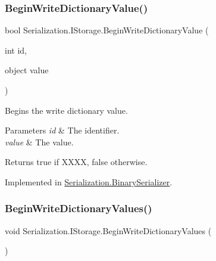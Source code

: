 \mbox{\label{interface_serialization_1_1_i_storage_a553edaa5a225986c161626c9ede9e594}} 
\subsubsection{\texorpdfstring{Begin\+Write\+Dictionary\+Value()}{BeginWriteDictionaryValue()}}
{\footnotesize\ttfamily bool Serialization.\+I\+Storage.\+Begin\+Write\+Dictionary\+Value (\begin{DoxyParamCaption}\item[{int}]{id,  }\item[{object}]{value }\end{DoxyParamCaption})}



Begins the write dictionary value. 


\begin{DoxyParams}{Parameters}
{\em id} & The identifier.\\
\hline
{\em value} & The value.\\
\hline
\end{DoxyParams}
\begin{DoxyReturn}{Returns}
{\ttfamily true} if X\+X\+XX, {\ttfamily false} otherwise.
\end{DoxyReturn}


Implemented in \hyperlink{class_serialization_1_1_binary_serializer_a4dc4587767b33a9c6310da4de7314cc8}{Serialization.\+Binary\+Serializer}.

\mbox{\label{interface_serialization_1_1_i_storage_af44f1eb41f0ac51acf315388150bd6bf}} 
\subsubsection{\texorpdfstring{Begin\+Write\+Dictionary\+Values()}{BeginWriteDictionaryValues()}}
{\footnotesize\ttfamily void Serialization.\+I\+Storage.\+Begin\+Write\+Dictionary\+Values (\begin{DoxyParamCaption}{ }\end{DoxyParamCaption})}



